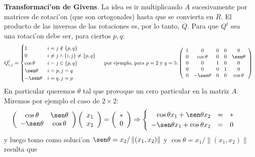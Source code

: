 \documentclass[a4paper,spanish]{article}
\newcommand{\norma}[1]{\left\|#1\right\|}
\newcommand{\lthen}[0]{\Rightarrow}
\begin{document}
\textbf{Transformaci'on de Givens}. La idea es ir multiplicando $A$
sucesivamente por matrices de rotaci'on (que son ortogonales) hasta que se
convierta en $R$. El producto de las inversas de las rotaciones es, por lo
tanto, $Q$. Para que $Q^t$ sea una rotaci'on debe ser, para ciertos $p,q$:
$$Q^t_{i,j} = \begin{cases}
1 & i = j \notin \{p,q\} \\
0 & i \neq j \land \{i,j\} \neq \{p,q\} \\
\cos \theta & i = j \in \{p,q\} \\
\sen \theta & i = p, j = q \\
-\sen \theta & i = q, j = p \\
\end{cases}
\hspace{0.5cm}
\mbox{por ejemplo, para } p=2 \mbox{ y } q=5 \mbox{:}
\left(
\begin{array}{ccccc}
1 & 0 & 0 & 0 & 0\\
0 & \cos \theta & 0 & 0 & \sen \theta \\
0 & 0 & 1 & 0 & 0 \\
0 & 0 & 0 & 1 & 0 \\
0 & -\sen \theta & 0 & 0 & \cos \theta \\
\end{array}
\right)
$$
En particular queremos $\theta$ tal que provoque un cero particular en la
matriz $A$. Miremos por ejemplo el caso de $2 \times 2$:
$$\left(
\begin{array}{cc}
\cos \theta & \sen \theta \\
-\sen \theta & \cos \theta \\
\end{array}\right)
\left(\begin{array}{l}
x_1 \\ x_2
\end{array}\right)
=
\left(\begin{array}{l}
* \\ 0
\end{array}\right)
\lthen
\begin{cases}
\begin{array}{rcl}
\cos \theta x_1 + \sen \theta x_2 &=& * \\
-\sen \theta x_1 + \cos \theta x_2 &=& 0 \\
\end{array}
\end{cases}
$$
y luego tomo como soluci'on $\sen \theta = x_2 / \norma{(x_1,x_2)}$ y $
\cos \theta = x_1 / \norma{(x_1,x_2)}$ resulta que 
\end{document}
